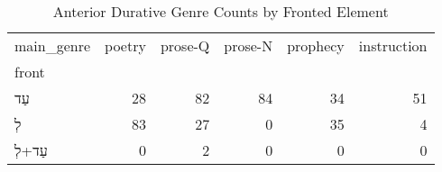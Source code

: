 \begin{table}[htbp!]
\centering
\caption{Anterior Durative Genre Counts by Fronted Element}
\label{table:antdur_gen_ct}
\begin{tabular}{lrrrrr}
\toprule
main\_genre &  poetry &  prose-Q &  prose-N &  prophecy &  instruction \\
front  &         &          &          &           &              \\
\midrule
עַד    &      28 &       82 &       84 &        34 &           51 \\
לְ     &      83 &       27 &        0 &        35 &            4 \\
עַד+לְ &       0 &        2 &        0 &         0 &            0 \\
\bottomrule
\end{tabular}
\end{table}
